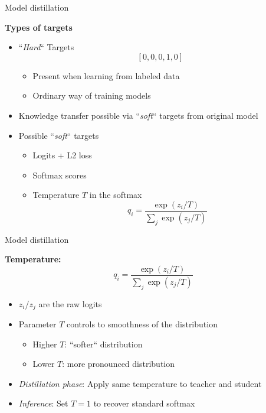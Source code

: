 
\begin{frame}{Model distillation}

\vfill

\textbf{Types of targets} 

\begin{itemize}
	\item ``\textit{Hard}`` Targets $$[0, 0, 0, 1, 0]$$ \vspace{-.5cm}
		\begin{itemize}
			\item Present when learning from labeled data
			\item Ordinary way of training models
		\end{itemize}
	\item Knowledge transfer possible via ``\textit{soft}`` targets from original model
	\item Possible ``\textit{soft}`` targets
		\begin{itemize}
			\item Logits + L2 loss 
			\item Softmax scores
			\item Temperature $T$ in the softmax 
						$$q_i = \frac{\exp(z_i/T)}{\sum_j \exp(z_j/T)}$$
		\end{itemize}
\end{itemize}

\vfill

\end{frame}


\begin{frame}{Model distillation}

\vfill

\textbf{Temperature:}\\$$q_i = \frac{\exp(z_i/T)}{\sum_j \exp(z_j/T)}$$

\begin{itemize}
	\item $z_i$/$z_j$ are the raw logits
	\item Parameter $T$ controls to smoothness of the distribution
		\begin{itemize}
			\item Higher $T$: ``softer`` distribution
			\item Lower $T$: more pronounced distribution
		\end{itemize}
	\item \textit{Distillation phase}: Apply same temperature to teacher and student
	\item \textit{Inference}: Set $T = 1$ to recover standard softmax						
\end{itemize}

\vfill

\end{frame}

